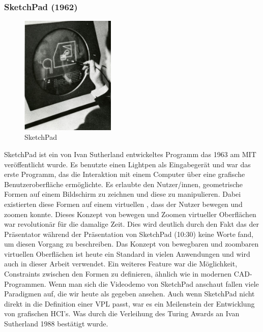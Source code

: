 \documentclass[ngerman]{article}
\begin{document}
\subsubsection{SketchPad (1962)}
\label{sec:SketchPad}
\begingroup
\setlength\intextsep{4pt}
\begin{minipage}{\linewidth}
\begin{figure}
  \centering
  \includegraphics[width=0.4\textwidth]{./graphics/sketchpad-sutherland.jpg} %
  \caption{SketchPad \cite{sutherlandSketchpad}}
\end{figure}
SketchPad ist ein von Ivan Sutherland entwickeltes Programm das 1963 am MIT veröffentlicht wurde. 
Es benutzte einen Lightpen als Eingabegerät und war das erste Programm, das die Interaktion mit einem Computer über eine grafische Benutzeroberfläche ermöglichte. 
Es erlaubte den Nutzer/innen, geometrische Formen auf einem Bildschirm zu zeichnen und diese zu manipulieren.
  Dabei existierten diese Formen auf einem virtuellen , dass der Nutzer bewegen und zoomen konnte. Dieses Konzept von bewegen und Zoomen virtueller Oberflächen war revolutionär für die damalige Zeit.
  Dies wird deutlich durch den Fakt das der Präsentator während der Präsentation von SketchPad \cite{sketchpadDemo} (10:30) keine Worte fand, um diesen Vorgang zu beschreiben. Das Konzept von bewegbaren und zoombaren virtuellen Oberflächen ist heute ein Standard in vielen Anwendungen und wird auch in dieser Arbeit verwendet.
Ein weiteres Feature war die Möglichkeit, Constraints zwischen den Formen zu definieren, ähnlich wie in modernen CAD-Programmen. 
Wenn man sich die Videodemo von SketchPad anschaut fallen viele Paradigmen auf, die wir heute als gegeben ansehen.
Auch wenn SketchPad nicht direkt in die Definition einer VPL passt, war es ein Meilenstein der Entwicklung von grafischen HCI's. Was durch die Verleihung des Turing Awards an Ivan Sutherland 1988 bestätigt wurde.
\end{minipage}
\endgroup
\end{document}
